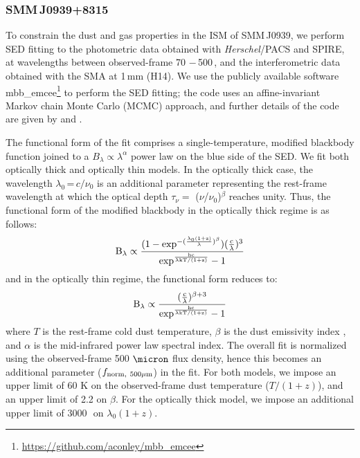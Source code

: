 \documentclass[iop, revtex4]{emulateapj}
\begin{document}
\subsubsection{SMM\,J0939+8315} \label{sec:SEDBg}
To constrain the dust and gas properties in the ISM of SMM\,J0939, we perform SED fitting to the
photometric data obtained with {\it Herschel}/PACS and SPIRE, at wavelengths
between observed-frame 70\,\micron\,$-$\,500\,\micron, and the interferometric data obtained with the SMA at 1\,mm (H14). We use the publicly
available software {\sc mbb\_emcee}\footnote{\url{https://github.com/aconley/mbb\_emcee}} to perform the SED fitting; the code uses an affine-invariant Markov chain Monte
Carlo (MCMC) approach, and further details of the code are given by \citet{Riechers13a} and \citet{Dowell14a}. \par
The
functional form of the fit comprises a single-temperature, modified blackbody function joined to a $B_{\lambda} \propto \lambda^\alpha
$ power law on the blue
side of the SED.
We fit both optically thick and optically thin models. In the optically thick case, the wavelength $
\lambda_0$\,=\,${c}/{\nu_0}$ is an additional parameter representing the rest-frame wavelength at which the optical
depth $\tau_{\nu} =$ ($\nu$/$\nu_0$)$^\beta$ reaches unity. Thus, the functional form of the modified blackbody
in the optically thick regime is as follows:
\begin{equation}
\rm B_{\lambda} \propto \frac{(1-exp^{-(\frac{\lambda_0 (1+z)}{\lambda})^{\beta}})(\frac{c}{\lambda})^3}
{exp^{\frac{hc}{\lambda\rm{kT/(1+z)} } }-1}
\end{equation}
and in the optically thin regime, the functional form reduces to:
\begin{equation}
\rm B_{\lambda} \propto \frac{(\frac{c}{\lambda})^{\beta+3}}{exp^{\frac{hc}{\lambda\rm{kT/(1+z)}}}-1}
\end{equation}
where $T$ is the rest-frame cold dust temperature, $\beta$ is the dust emissivity index
, and $\alpha$ is the mid-infrared power law spectral index. The overall fit is normalized using the observed-frame 500
$\micron$ flux density, hence this becomes an additional parameter ($f_{\rm norm,\ 500\mu m}$) in the fit. For both models, we impose an upper limit of 60 K on the observed-frame dust temperature ($T/(1+z)$), and an upper limit of 2.2 on
$\beta$. For the optically thick model, we impose an additional upper limit of 3000\,\micron\ on $\lambda_0 (1+z)$.
\end{document}
